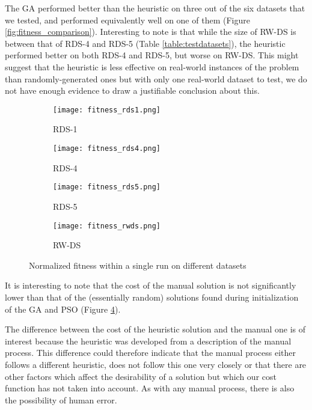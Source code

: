 \documentclass{sig-alternate}
\begin{document}
The GA performed better than the heuristic on three out of the six datasets that we tested, and performed equivalently well on one of them (Figure \ref{fig:fitness_comparison}). Interesting to note is that while the size of RW-DS is between that of RDS-4 and RDS-5 (Table \ref{table:testdatasets}), the heuristic performed better on both RDS-4 and RDS-5, but worse on RW-DS. This might suggest that the heuristic is less effective on real-world instances of the problem than randomly-generated ones but with only one real-world dataset to test, we do not have enough evidence to draw a justifiable conclusion about this.

\begin{figure*}
	\begin{subfigure}{.5\textwidth}
	  \centering
	  \texttt{[image: fitness\_rds1.png]}
	  \caption{RDS-1}
	  \label{fig:run_rds1}
	\end{subfigure}%
	\begin{subfigure}{.5\textwidth}
	  \centering
	  \texttt{[image: fitness\_rds4.png]}
	  \caption{RDS-4}
	  \label{fig:run_rds4}
	\end{subfigure}
	\begin{subfigure}{.5\textwidth}
	  \centering
	  \texttt{[image: fitness\_rds5.png]}
	  \caption{RDS-5}
	  \label{fig:run_rds5}
	\end{subfigure}
	\begin{subfigure}{.5\textwidth}
	  \centering
	  \texttt{[image: fitness\_rwds.png]}
	  \caption{RW-DS}
	  \label{fig:run_rwds}
	\end{subfigure}
	\caption{Normalized fitness within a single run on different datasets}
	\label{fig:run_fitnesses}
\end{figure*}

It is interesting to note that the cost of the manual solution is not significantly lower than that of the (essentially random) solutions found during initialization of the GA and PSO (Figure \ref{fig:run_rwds}).

The difference between the cost of the heuristic solution and the manual one is of interest because the heuristic was developed from a description of the manual process. This difference could therefore indicate that the manual process either follows a different heuristic, does not follow this one very closely or that there are other factors which affect the desirability of a solution but which our cost function has not taken into account. As with any manual process, there is also the possibility of human error.
\end{document}
